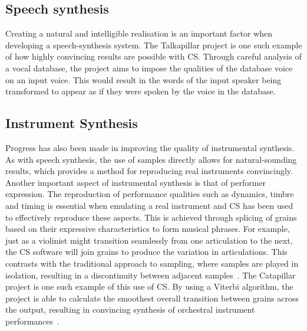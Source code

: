 \documentclass{scrartcl}
\begin{document}
    \subsection*{Speech synthesis}
    Creating a natural and intelligible realisation is an important factor when
    developing a speech-synthesis system. The Talkapillar project is one such
    example of how highly convincing results are possible with CS. Through
    careful analysis of a vocal database, the project aims to impose the
    qualities of the database voice on an input voice. This would result in the
    words of the input speaker being transformed to appear as if they were
    spoken by the voice in the database.~\parencite{Hueber}
    
    \subsection*{Instrument Synthesis}
    Progress has also been made in improving the quality of instrumental
    synthesis. As with speech synthesis, the use of samples directly allows for
    natural-sounding results, which provides a method for reproducing real
    instruments convincingly. Another important aspect of instrumental synthesis is that of performer
    expression. The reproduction of performance qualities such as dynamics,
    timbre and timing is essential when emulating a real instrument and CS has
    been used to effectively reproduce these aspects. This is achieved through
    splicing of grains based on their expressive characteristics to form
    musical phrases.  For example, just as a violinist might transition
    seamlessly from one articulation to the next, the CS software will join
    grains to produce the variation in articulations. This contrasts with the
    traditional approach to sampling, where samples are played in isolation,
    resulting in a discontinuity between adjacent samples~\parencite[p. 82]{Lindemann2007}. 
    The Catapillar project is one such example of this use of CS. 
    By using a Viterbi algorithm, the project is able to calculate the
    smoothest overall transition between grains across the output, resulting
    in convincing synthesis of orchestral instrument performances~\parencite[p. 5]{Schwarz2003}.
\end{document}
